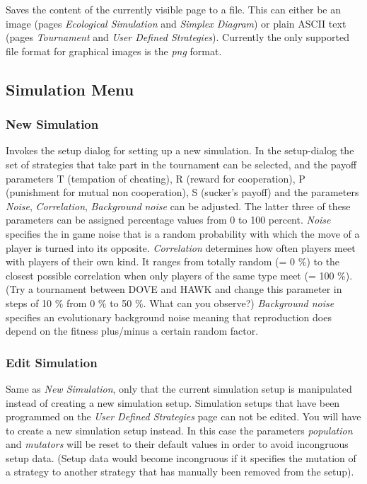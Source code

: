 \documentclass[12pt,a4paper,USenglish]{article}
\begin{document}
Saves the content of the currently visible page to a file. This can
either be an image (pages \emph{Ecological Simulation} and \emph{Simplex
Diagram}) or plain ASCII text (pages \emph{Tournament} and \emph{User
Defined Strategies}). Currently the only supported file format for
graphical images is the \emph{png} format.


\subsection{Simulation Menu}


\subsubsection{New Simulation}

Invokes the setup dialog for setting up a new simulation. In the setup-dialog
the set of strategies that take part in the tournament can be selected, and
the payoff parameters T (tempation of cheating), R (reward for cooperation), P
(punishment for mutual non cooperation), S (sucker's payoff) and the
parameters \emph{Noise}, \emph{Correlation}, \emph{Background} \emph{noise}
can be adjusted. The latter three of these parameters can be assigned
percentage values from 0 to 100 percent. \emph{Noise} specifies the in game
noise that is a random probability with which the move of a player is turned
into its opposite.  \emph{Correlation} determines how often players meet with
players of their own kind. It ranges from totally random (= 0 \%) to the
closest possible correlation when only players of the same type meet (= 100
\%).  (Try a tournament between DOVE and HAWK and change this parameter in
steps of 10 \% from 0 \% to 50 \%. What can you observe?)  \emph{Background
  noise} specifies an evolutionary background noise meaning that reproduction
does depend on the fitness plus/minus a certain random factor.

\subsubsection{Edit Simulation}

Same as \emph{New Simulation}, only that the current simulation setup
is manipulated instead of creating a new simulation setup. Simulation
setups that have been programmed on the \emph{User Defined Strategies}
page can not be edited. You will have to create a new simulation setup
instead. In this case the parameters \emph{population} and
\emph{mutators} will be reset to their default values in order to
avoid incongruous setup data. (Setup data would become incongruous if
it specifies the mutation of a strategy to another strategy that
has manually been removed from the setup).
\end{document}
